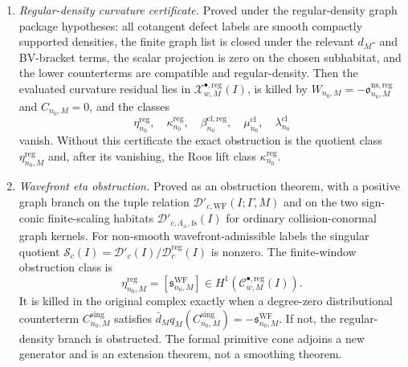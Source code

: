 \begin{stmt}
\begin{enumerate}[label=(\arabic*)]
    \item \emph{Regular-density curvature certificate.}  Proved under the
    regular-density graph package hypotheses: all cotangent defect labels
    are smooth compactly supported densities, the finite graph list is
    closed under the relevant \(d_M\)- and BV-bracket terms, the scalar
    projection is zero on the chosen subhabitat, and the lower counterterms
    are compatible and regular-density.  Then the evaluated curvature
    residual lies in
    \(\mathcal X^{\bullet,\mathrm{reg}}_{w,M}(I)\), is killed by
    \(W_{n_0,M}=-\mathfrak o^{\mathrm{ns,reg}}_{n_0,M}\) and
    \(C_{n_0,M}=0\), and the classes
    \[
      \eta^{\mathrm{reg}}_{n_0},\quad
      \kappa^{\mathrm{reg}}_{n_0},\quad
      \beta^{\mathrm{cl},\mathrm{reg}}_{n_0},\quad
      \mu^{\mathrm{cl}}_{n_0},\quad
      \lambda^{\mathrm{cl}}_{n_0}
    \]
    vanish.  Without this certificate the exact obstruction is the
    quotient class
    \(\eta^{\mathrm{reg}}_{n_0,M}\) and, after its vanishing, the Roos
    lift class \(\kappa^{\mathrm{reg}}_{n_0}\).

    \item \emph{Wavefront eta obstruction.}  Proved as an obstruction
    theorem, with a positive graph branch on the tuple relation
    \(\mathcal D'_{c,\mathrm{WF}}(I;\Gamma,M)\) and on the two
    sign-conic finite-scaling habitats
    \(\mathcal D'_{c,\Lambda_\pm,\mathrm{fs}}(I)\) for ordinary
    collision-conormal graph kernels.  For non-smooth
    wavefront-admissible labels the singular quotient
    \(\mathcal S_c(I)=\mathcal D'_c(I)/\mathcal D^{\mathrm{reg}}_c(I)\)
    is nonzero.  The finite-window obstruction class is
    \[
      \eta^{\mathrm{reg}}_{n_0,M}
      =
      [\mathfrak s^{\mathrm{WF}}_{n_0,M}]
      \in
      H^1(\mathcal C^{\bullet,\mathrm{reg}}_{w,M}(I)).
    \]
    It is killed in the original complex exactly when a degree-zero
    distributional counterterm \(C^{\mathrm{sing}}_{n_0,M}\) satisfies
    \(\bar d_Mq_M(C^{\mathrm{sing}}_{n_0,M})
    =-\mathfrak s^{\mathrm{WF}}_{n_0,M}\).  If not, the regular-density
    branch is obstructed.  The formal primitive cone adjoins a new
    generator and is an extension theorem, not a smoothing theorem.


\end{enumerate}
\end{stmt}
